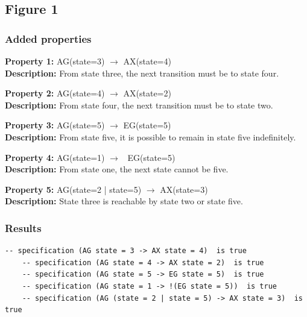 \documentclass[11pt]{article}
\begin{document}
\subsection{Figure 1}
	\subsubsection{Added properties}
	
		\textbf{Property 1:} 	AG(state=3) $\to$ AX(state=4) 	\\	
		\textbf{Description:} From state three, the next transition must be to state four. \\
		\vspace{12pt}
		
		\textbf{Property 2:} AG(state=4) $\to$ AX(state=2)\\ 
		\textbf{Description:} From state four, the next transition must be to state two. \\
		\vspace{12pt}
		
		\textbf{Property 3:} 	AG(state=5) $\to$ EG(state=5)\\ 
		\textbf{Description:} From state five, it is possible to remain in state five indefinitely. \\
		\vspace{12pt}
		
		\textbf{Property 4:} AG(state=1) $\to$ ~EG(state=5) \\
		\textbf{Description:} From state one, the next state cannot be five.\\
		\vspace{12pt}
		
		\textbf{Property 5:} AG(state=2 | state=5) $\to$ AX(state=3)  \\
		\textbf{Description:} State three is reachable by state two or state five.\\
	
	
	\subsubsection{Results}
	
	\begin{lstlisting}[caption=NuSMV Kripke Diagram Output, label=p2_1_out]	
	-- specification (AG state = 3 -> AX state = 4)  is true
	-- specification (AG state = 4 -> AX state = 2)  is true
	-- specification (AG state = 5 -> EG state = 5)  is true
	-- specification (AG state = 1 -> !(EG state = 5))  is true
	-- specification (AG (state = 2 | state = 5) -> AX state = 3)  is true
	\end{lstlisting}
	
\end{document}
